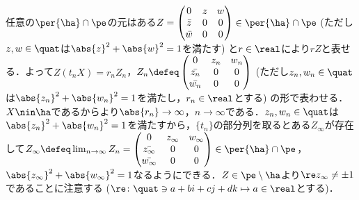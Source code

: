 \begin{npfwn}
  任意の$\per{\ha}\cap\pe $の元はある$Z =
  \begin{pmatrix}
    0 & z & w \\
    \bar{z} & 0 & 0 \\
    \bar{w} & 0 & 0 
  \end{pmatrix} \in \per{\ha}\cap\pe $ (ただし$z,w\in \quat$は$ \abs{z}^2 +\abs{w}^2  = 1 $を満たす) と$r\in \real$により$rZ$と表せる．よって$Z(t_nX) = r_nZ_n$，$Z_n\defeq \begin{pmatrix}
    0 & z_n & w_n \\
    \bar{z_n} & 0 & 0 \\
    \bar{w_n} & 0 & 0 
  \end{pmatrix} $ (ただし$z_n,w_n\in \quat $は$ \abs{z_n}^2 +\abs{w_n}^2  = 1 $を満たし，$r_n\in \real$とする) の形で表わせる．$X\nin\ha$であるからより$\abs{r_n}\to \infty $，$n\to \infty$である．$z_n,w_n\in \quat $は$ \abs{z_n}^2 +\abs{w_n}^2  = 1 $を満たすから，$\{t_n\} $の部分列を取るとある$Z_{\infty} $が存在して$Z_{\infty}\defeq \lim_{n\to \infty}Z_n  =
  \begin{pmatrix}
    0 & z_{\infty} & w_{\infty} \\
    \bar{z_{\infty}} & 0 & 0 \\
    \bar{w_{\infty}} & 0 & 0 
  \end{pmatrix}
  \in \per{\ha}\cap\pe $，$\abs{z_{\infty}}^2 +\abs{w_{\infty} }^2  = 1$なるようにできる．$Z\in\pe\setminus \ha $より$\re z_{\infty} \neq \pm 1$であることに注意する ($\re\colon \quat\ni a+bi+cj+dk\mapsto a\in \real$とする)．


\end{npfwn}
